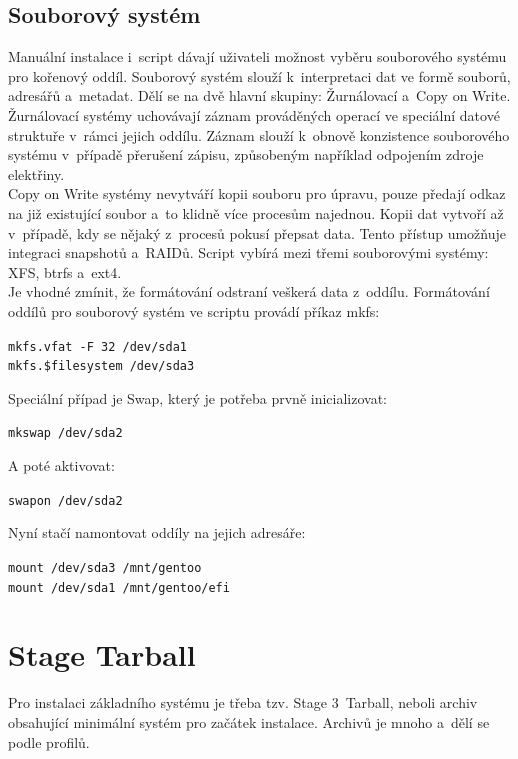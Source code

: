 \documentclass[12pt,a4paper,twoside,]{article}
\begin{document}
{\subsection{\textsf{Souborový systém}}\hypertarget{Souborový systém}{}
Manuální instalace i~script dávají uživateli možnost vyběru souborového systému pro kořenový oddíl.
Souborový systém slouží k~interpretaci dat ve formě souborů, adresářů a~metadat. Dělí se na dvě hlavní skupiny: Žurnálovací a~Copy on Write.\\
Žurnálovací systémy uchovávají záznam prováděných operací ve speciální datové struktuře v~rámci jejich oddílu. 
Záznam slouží k~obnově konzistence souborového systému v~případě přerušení zápisu, způsobeným například odpojením zdroje elektřiny. \\
Copy on Write systémy nevytváří kopii souboru pro úpravu, pouze předají odkaz na již existující soubor a~to klidně více procesům najednou.
Kopii dat vytvoří až v~případě, kdy se nějaký z~procesů pokusí přepsat data. Tento přístup umožňuje integraci snapshotů a~RAIDů.
Script vybírá mezi třemi souborovými systémy: XFS, btrfs a~ext4. \\Je vhodné zmínit, že formátování odstraní veškerá data z~oddílu. 
Formátování oddílů pro souborový systém ve scriptu provádí příkaz mkfs: 

\texttt{mkfs.vfat -F 32 /dev/sda1}\\
\texttt{\hspace*{1.5em}mkfs.\$filesystem /dev/sda3}

\hspace*{-1.5em}Speciální případ je Swap, který je potřeba prvně inicializovat: 

\texttt{mkswap /dev/sda2}

\hspace*{-1.5em}A poté aktivovat:

\texttt{swapon /dev/sda2}

\hspace*{-1.5em}Nyní stačí namontovat oddíly na jejich adresáře:

\texttt{mount /dev/sda3 /mnt/gentoo}\\
\texttt{\hspace*{1.5em}mount /dev/sda1 /mnt/gentoo/efi}

\newpage
\section{\textsf{Stage Tarball}}
{Pro instalaci základního systému je třeba tzv. Stage 3~Tarball, neboli archiv obsahující
minimální systém pro začátek instalace. Archivů je mnoho a~dělí se podle profilů.

}}
\end{document}

